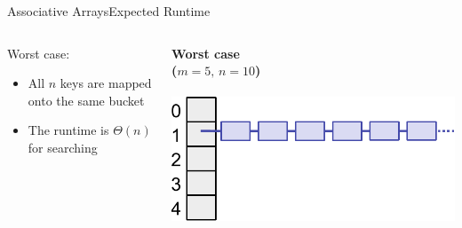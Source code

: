 \begin{frame}{Associative Arrays}{Expected Runtime}
  \begin{columns}
    \begin{column}{0.4\linewidth}
      {\color{Mittel-Blau}Worst case}:
      \begin{itemize}
        \item
          All {\color{Mittel-Blau}$n$} keys are mapped onto the same bucket
        \item
          The runtime is {\color{Mittel-Blau}$\Theta(n)$} for searching
      \end{itemize}
    \end{column}
    \begin{column}{0.5\linewidth}
      \begin{center}
        \textbf{Worst case}\\
       \textbf{($m = 5, \, n = 10$)}\\
\ \\
        \includegraphics[height=0.4\textheight]{Images/hash-extreme.pdf}
        \label{tab:hash_table:runtime_worst_case}
      \end{center}
    \end{column}
  \end{columns}
\end{frame}

